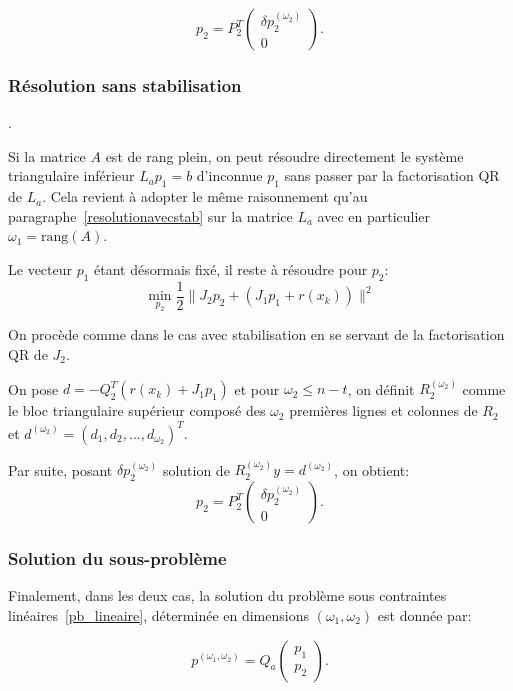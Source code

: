 \begin{equation}
p_2 = P_2^T\begin{pmatrix} \delta p_2^{(\omega_{2})} \\ 0 \end{pmatrix}.
\end{equation}

\subsubsection{Résolution sans stabilisation} \label{resolutionsstab}.

Si la matrice $A$ est de rang plein, on peut résoudre directement le système triangulaire inférieur $L_{a}p_{1}=b$ d'inconnue $p_1$ sans passer par la 
factorisation QR de $L_a$. 
Cela revient à adopter le même raisonnement qu'au paragraphe~\ref{resolutionavecstab} sur la matrice $L_a$ avec en particulier $\omega_1=\text{rang}(A)$.

Le vecteur $p_1$ étant désormais fixé, il reste à résoudre pour $p_2$: $$\underset{p_2}{\min} \dfrac{1}{2}\|J_2p_2 + (J_1p_1 + r(x_{k}))\|^2$$

On procède comme dans le cas avec stabilisation en se servant de la factorisation QR de $J_2$.

On pose $d = -Q_2^T(r(x_{k}) + J_1p_1)$ et pour $\omega_{2} \leq n-t$, on définit $R_{2}^{(\omega_{2} )}$ comme le bloc triangulaire supérieur composé 
des $\omega_{2}$ premières lignes et colonnes de $R_{2}$ et $d^{(\omega_{2})} = (d_1, d_2, \ldots, d_{\omega_{2}})^T$.

Par suite, posant $\delta p_2^{(\omega_{2})}$ solution de $R_{2}^{(\omega_{2})}y =d^{(\omega_{2})}$, on obtient:
\begin{equation} \label{calculp2}
p_2 = P_2^T\begin{pmatrix} \delta p_2^{(\omega_{2})} \\ 0 \end{pmatrix}.
\end{equation}

\subsubsection{Solution du sous-problème}\label{sol sous pb}
Finalement, dans les deux cas, la solution du problème sous contraintes linéaires~\eqref{pb_lineaire}, déterminée en dimensions $(\omega_{1}, \omega_{2})$ est donnée par: 

\begin{equation}\label{solution p}
{p^{(\omega_{1},\omega_{2})} = Q_{a} \begin{pmatrix} p_1 \\ p_2 \end{pmatrix}}.
\end{equation}

